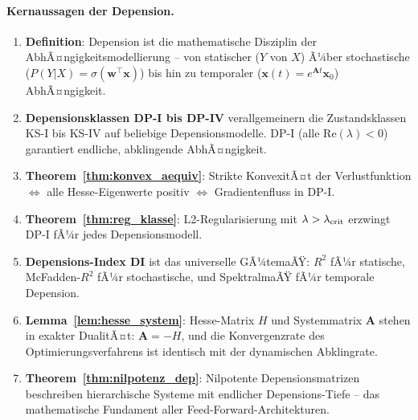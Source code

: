 ﻿\documentclass[12pt, a4paper]{article}
\theoremstyle{definition}
\theoremstyle{remark}
\newcommand{\sigmoid}{\sigma}
\newcommand{\vw}{\bm{w}}
\newcommand{\vx}{\bm{x}}
\newcommand{\vA}{\bm{A}}
\newcommand{\T}{\top}
\newcommand{\re}{\mathrm{Re}}
\begin{document}
\paragraph*{Kernaussagen der Depension.}
\begin{enumerate}[label=(\arabic*), leftmargin=1.5em]
  \item \textbf{Definition}: Depension ist die mathematische Disziplin der
    AbhÃ¤ngigkeitsmodellierung -- von statischer ($Y$ von $X$) Ã¼ber stochastische
    ($P(Y|X) = \sigmoid(\vw^\T\vx)$) bis hin zu temporaler ($\vx(t) = e^{\vA t}\vx_0$)
    AbhÃ¤ngigkeit.

  \item \textbf{Depensionsklassen DP-I bis DP-IV} verallgemeinern die Zustandsklassen
    KS-I bis KS-IV auf beliebige Depensionsmodelle. DP-I (alle $\re(\lambda)<0$)
    garantiert endliche, abklingende AbhÃ¤ngigkeit.

  \item \textbf{Theorem~\ref{thm:konvex_aequiv}}: Strikte KonvexitÃ¤t der Verlustfunktion
    $\Leftrightarrow$ alle Hesse-Eigenwerte positiv $\Leftrightarrow$
    Gradientenfluss in DP-I.

  \item \textbf{Theorem~\ref{thm:reg_klasse}}: L2-Regularisierung mit
    $\lambda > \lambda_{\rm crit}$ erzwingt DP-I fÃ¼r jedes Depensionsmodell.

  \item \textbf{Depensions-Index DI} ist das universelle GÃ¼temaÃŸ: $R^2$ fÃ¼r
    statische, McFadden-$R^2$ fÃ¼r stochastische, und SpektralmaÃŸ fÃ¼r temporale
    Depension.

  \item \textbf{Lemma~\ref{lem:hesse_system}}: Hesse-Matrix $H$ und Systemmatrix
    $\vA$ stehen in exakter DualitÃ¤t: $\vA = -H$, und die Konvergenzrate des
    Opti\-mie\-rungs\-ver\-fah\-rens ist identisch mit der dynamischen Abklingrate.

  \item \textbf{Theorem~\ref{thm:nilpotenz_dep}}: Nilpotente Depensionsmatrizen
    beschreiben hierarchische Systeme mit endlicher Depensions-Tiefe -- das
    mathematische Fundament aller Feed-Forward-Architekturen.
\end{enumerate}
\end{document}
